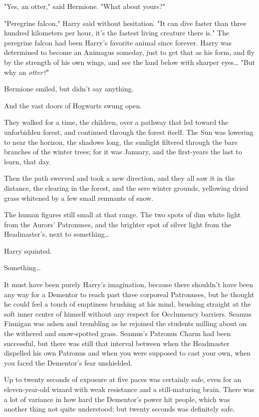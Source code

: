 "Yes, an otter," said Hermione. "What about yours?"

"Peregrine falcon," Harry said without hesitation. "It can dive faster than 
three hundred kilometers per hour, it's the fastest living creature there is." 
The peregrine falcon had been Harry's favorite animal since forever. Harry was 
determined to become an Animagus someday, just to get that as his form, and fly 
by the strength of his own wings, and see the land below with sharper 
eyes{\ldots} "But why an \emph{otter?}"

Hermione smiled, but didn't say anything.

And the vast doors of Hogwarts swung open.

They walked for a time, the children, over a pathway that led toward the 
unforbidden forest, and continued through the forest itself. The Sun was 
lowering to near the horizon, the shadows long, the sunlight filtered through 
the bare branches of the winter trees; for it was January, and the first-years 
the last to learn, that day.

Then the path swerved and took a new direction, and they all saw it in the 
distance, the clearing in the forest, and the sere winter grounds, yellowing 
dried grass whitened by a few small remnants of snow.

The human figures still small at that range. The two spots of dim white light 
from the Aurors' Patronuses, and the brighter spot of silver light from the 
Headmaster's, next to something{\ldots}

Harry squinted.

Something{\ldots}

It must have been purely Harry's imagination, because there shouldn't have been 
any way for a Dementor to reach past three corporeal Patronuses, but he thought 
he could feel a touch of emptiness brushing at his mind, brushing straight at 
the soft inner center of himself without any respect for Occlumency barriers.
\sbreak
Seamus Finnigan was ashen and trembling as he rejoined the students milling 
about on the withered and snow-spotted grass. Seamus's Patronus Charm had been 
successful, but there was still that interval between when the Headmaster 
dispelled his own Patronus and when you were supposed to cast your own, when 
you faced the Dementor's fear unshielded.

Up to twenty seconds of exposure at five paces was certainly safe, even for an 
eleven-year-old wizard with weak resistance and a still-maturing brain. There 
was a lot of variance in how hard the Dementor's power hit people, which was 
another thing not quite understood; but twenty seconds was definitely safe.

